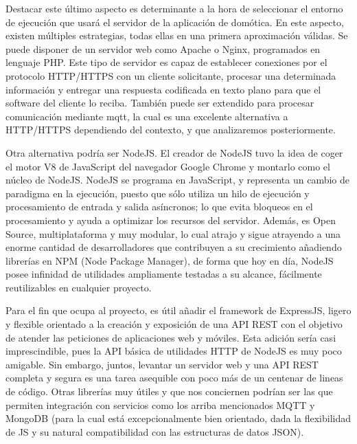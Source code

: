 \vspace{1cm}

Destacar este último aspecto es determinante a la hora de seleccionar el entorno de ejecución que usará el servidor de la aplicación de domótica. En este aspecto, existen múltiples estrategias, todas ellas en una primera aproximación válidas. Se puede disponer de un servidor web como Apache o Nginx, programados en lenguaje PHP. Este tipo de servidor es capaz de establecer conexiones por el protocolo HTTP/HTTPS con un cliente solicitante, procesar una determinada información y entregar una respuesta codificada en texto plano para que el software del cliente lo reciba. También puede ser extendido para procesar comunicación mediante \gls{mqtt}, la cual es una excelente alternativa a HTTP/HTTPS dependiendo del contexto, y que analizaremos posteriormente.

\vspace{1cm}

Otra alternativa podría ser NodeJS. El creador de NodeJS tuvo la idea de coger el motor V8 de JavaScript del navegador Google Chrome y montarlo como el núcleo de NodeJS. NodeJS se programa en JavaScript, y representa un cambio de paradigma en la ejecución, puesto que sólo utiliza un hilo de ejecución y procesamiento de entrada y salida asíncronos; lo que evita bloqueos en el procesamiento y ayuda a optimizar los recursos del servidor.  Además, es Open Source, multiplataforma y muy modular, lo cual atrajo y sigue atrayendo a una enorme cantidad de desarrolladores que contribuyen a su crecimiento añadiendo librerías en NPM (Node Package Manager), de forma que hoy en día, NodeJS posee infinidad de utilidades ampliamente testadas a su alcance, fácilmente reutilizables en cualquier proyecto.

\vspace{1cm}

Para el fin que ocupa al proyecto, es útil añadir el \gls{framework} de ExpressJS, ligero y flexible orientado a la creación y exposición de una API REST con el objetivo de atender las peticiones de aplicaciones web y móviles. Esta adición sería casi imprescindible, pues la API básica de utilidades HTTP de NodeJS es muy poco amigable. Sin embargo, juntos, levantar un servidor web y una API REST completa y segura es una tarea asequible con poco más de un centenar de lineas de código. Otras librerías muy útiles y que nos conciernen podrían ser las que permiten integración con servicios como los arriba mencionados MQTT y MongoDB (para la cual está excepcionalmente bien orientado, dada la flexibilidad de JS y su natural compatibilidad con las estructuras de datos JSON).

